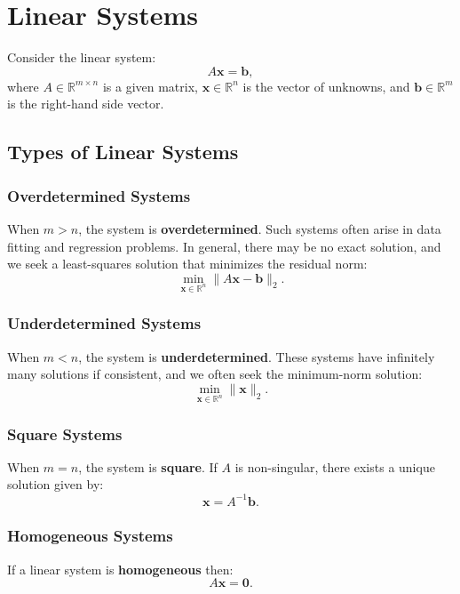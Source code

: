 \chapter{Linear Systems}
\label{chap:linear-systems}

Consider the linear system:
\begin{equation}
    A \mathbf{x} = \mathbf{b},
    \label{eq:linear-system}
\end{equation}
where $A \in \mathbb{R}^{m \times n}$ is a given matrix, $\mathbf{x} \in \mathbb{R}^n$ is the vector of unknowns, and $\mathbf{b} \in \mathbb{R}^m$ is the right-hand side vector.

\section{Types of Linear Systems}
\subsection{Overdetermined Systems}
When $m > n$, the system is \textbf{overdetermined}. Such systems often arise in data fitting and regression problems. In general, there may be no exact solution, and we seek a least-squares solution that minimizes the residual norm:
\[
    \min_{\mathbf{x} \in \mathbb{R}^n} \|A\mathbf{x} - \mathbf{b}\|_2.
\]
\subsection{Underdetermined Systems}
When $m < n$, the system is \textbf{underdetermined}. These systems have infinitely many solutions if consistent, and we often seek the minimum-norm solution:
\[
    \min_{\mathbf{x} \in \mathbb{R}^n} \|\mathbf{x}\|_2.
\]
\subsection{Square Systems}
When $m = n$, the system is \textbf{square}. If $A$ is non-singular, there exists a unique solution given by:
\[
    \mathbf{x} = A^{-1}\mathbf{b}.
\]

\subsection{Homogeneous Systems}
If a linear system is \textbf{homogeneous} then:
\begin{equation}
    A\mathbf{x} = \mathbf{0}.
    \label{eq:homogeneous-system}
\end{equation}

